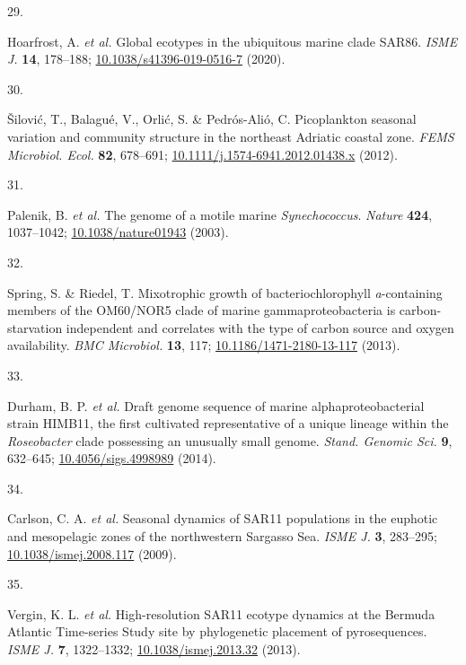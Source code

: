 \documentclass[
  12pt,
]{article}
\newlength{\cslhangindent}
\newlength{\csllabelwidth}
\newlength{\cslentryspacingunit} %
\newenvironment{CSLReferences}[2] %
 {%
  \setlength{\parindent}{0pt}
  \ifodd #1
  \let\oldpar\par
  \def\par{\hangindent=\cslhangindent\oldpar}
  \fi
  \setlength{\parskip}{#2\cslentryspacingunit}
 }%
 {}
\newcommand{\CSLLeftMargin}[1]{\parbox[t]{\csllabelwidth}{#1}}
\newcommand{\CSLRightInline}[1]{\parbox[t]{\linewidth - \csllabelwidth}{#1}\break}
\begin{document}
\begin{CSLReferences}{0}{0}
\leavevmode{}%
\CSLLeftMargin{29. }
\CSLRightInline{Hoarfrost, A. \emph{et al.} Global ecotypes in the
ubiquitous marine clade {SAR86}. \emph{ISME J.} \textbf{14}, 178--188;
\href{https://doi.org/10.1038/s41396-019-0516-7}{10.1038/s41396-019-0516-7}
(2020).}

\leavevmode{}%
\CSLLeftMargin{30. }
\CSLRightInline{Šilović, T., Balagué, V., Orlić, S. \& Pedrós-Alió, C.
Picoplankton seasonal variation and community structure in the northeast
{Adriatic} coastal zone. \emph{FEMS Microbiol. Ecol.} \textbf{82},
678--691;
\href{https://doi.org/10.1111/j.1574-6941.2012.01438.x}{10.1111/j.1574-6941.2012.01438.x}
(2012).}

\leavevmode{}%
\CSLLeftMargin{31. }
\CSLRightInline{Palenik, B. \emph{et al.} The genome of a motile marine
{\emph{Synechococcus}}. \emph{Nature} \textbf{424}, 1037--1042;
\href{https://doi.org/10.1038/nature01943}{10.1038/nature01943} (2003).}

\leavevmode{}%
\CSLLeftMargin{32. }
\CSLRightInline{Spring, S. \& Riedel, T. Mixotrophic growth of
bacteriochlorophyll {\emph{a}}-containing members of the {OM60}/{NOR5}
clade of marine gammaproteobacteria is carbon-starvation independent and
correlates with the type of carbon source and oxygen availability.
\emph{BMC Microbiol.} \textbf{13}, 117;
\href{https://doi.org/10.1186/1471-2180-13-117}{10.1186/1471-2180-13-117}
(2013).}

\leavevmode{}%
\CSLLeftMargin{33. }
\CSLRightInline{Durham, B. P. \emph{et al.} Draft genome sequence of
marine alphaproteobacterial strain {HIMB11}, the first cultivated
representative of a unique lineage within the {\emph{Roseobacter}} clade
possessing an unusually small genome. \emph{Stand. Genomic Sci.}
\textbf{9}, 632--645;
\href{https://doi.org/10.4056/sigs.4998989}{10.4056/sigs.4998989}
(2014).}

\leavevmode{}%
\CSLLeftMargin{34. }
\CSLRightInline{Carlson, C. A. \emph{et al.} Seasonal dynamics of
{SAR11} populations in the euphotic and mesopelagic zones of the
northwestern {Sargasso Sea}. \emph{ISME J.} \textbf{3}, 283--295;
\href{https://doi.org/10.1038/ismej.2008.117}{10.1038/ismej.2008.117}
(2009).}

\leavevmode{}%
\CSLLeftMargin{35. }
\CSLRightInline{Vergin, K. L. \emph{et al.} High-resolution {SAR11}
ecotype dynamics at the {Bermuda Atlantic Time-series Study} site by
phylogenetic placement of pyrosequences. \emph{ISME J.} \textbf{7},
1322--1332;
\href{https://doi.org/10.1038/ismej.2013.32}{10.1038/ismej.2013.32}
(2013).}


\end{CSLReferences}
\end{document}
